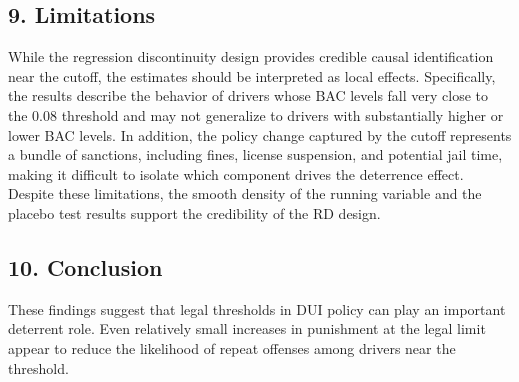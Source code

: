 \documentclass[
  letterpaper,
  DIV=11,
  numbers=noendperiod]{scrartcl}
\begin{document}
\subsection{9. Limitations}\label{limitations}

While the regression discontinuity design provides credible causal
identification near the cutoff, the estimates should be interpreted as
local effects. Specifically, the results describe the behavior of
drivers whose BAC levels fall very close to the 0.08 threshold and may
not generalize to drivers with substantially higher or lower BAC levels.
In addition, the policy change captured by the cutoff represents a
bundle of sanctions, including fines, license suspension, and potential
jail time, making it difficult to isolate which component drives the
deterrence effect. Despite these limitations, the smooth density of the
running variable and the placebo test results support the credibility of
the RD design.

\subsection{10. Conclusion}\label{conclusion}

These findings suggest that legal thresholds in DUI policy can play an
important deterrent role. Even relatively small increases in punishment
at the legal limit appear to reduce the likelihood of repeat offenses
among drivers near the threshold.

\begin{verbatim}
\end{verbatim}
\end{document}
